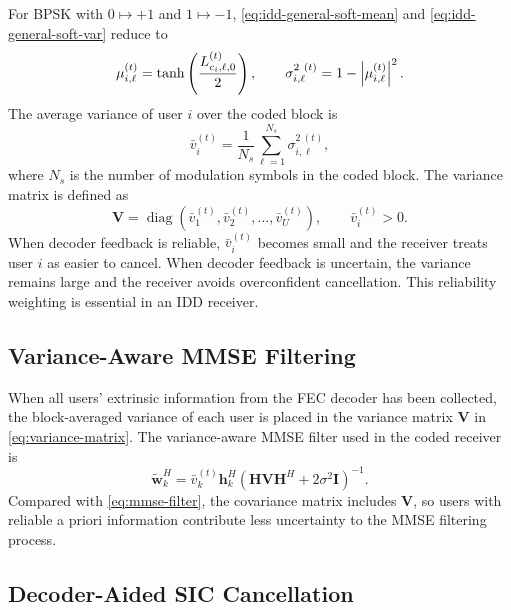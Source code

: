 For BPSK with $0\mapsto +1$ and $1\mapsto -1$, \eqref{eq:idd-general-soft-mean} and \eqref{eq:idd-general-soft-var} reduce to
\begin{equation}
    \mu^{(t)}_{i,\ell}
    =
    \tanh\left(\frac{L^{(t)}_{c_i,\ell,0}}{2}\right),
    \qquad
    \sigma^{2~(t)}_{i,\ell}
    =
    1-\left\lvert \mu^{(t)}_{i,\ell} \right\rvert^2 .
\end{equation}
The average variance of user $i$ over the coded block is
\begin{equation}
    \bar{v}^{(t)}_{i}
    =
    \frac{1}{N_s}\sum_{\ell=1}^{N_s}\sigma^{2~(t)}_{i,\ell},
\end{equation}
where $N_s$ is the number of modulation symbols in the coded block. The variance matrix is defined as
\begin{equation}
    \bm{V}
    =
    \operatorname{diag}(\bar{v}_1^{(t)},\bar{v}_2^{(t)},\ldots,\bar{v}_U^{(t)}),
    \qquad
    \bar{v}_i^{(t)}>0.
    \label{eq:variance-matrix}
\end{equation}
When decoder feedback is reliable, $\bar{v}_i^{(t)}$ becomes small and the receiver treats user $i$ as easier to cancel. When decoder feedback is uncertain, the variance remains large and the receiver avoids overconfident cancellation. This reliability weighting is essential in an IDD receiver.

\subsection{Variance-Aware MMSE Filtering}

When all users' extrinsic information from the FEC decoder has been collected, the block-averaged variance of each user is placed in the variance matrix $\bm{V}$ in \eqref{eq:variance-matrix}. The variance-aware MMSE filter used in the coded receiver is
\begin{equation}
    \label{eq:variance-aware-mmse}
    \tilde{\bm{w}}^H_k
    =
    \bar{v}_k^{(t)}\bm{h}_k^H
    \left(
    \bm{H}\bm{V}\bm{H}^H + 2\sigma^2\bm{I}
    \right)^{-1}.
\end{equation}
Compared with \eqref{eq:mmse-filter}, the covariance matrix includes $\bm{V}$, so users with reliable a priori information contribute less uncertainty to the MMSE filtering process.

\subsection{Decoder-Aided SIC Cancellation}

